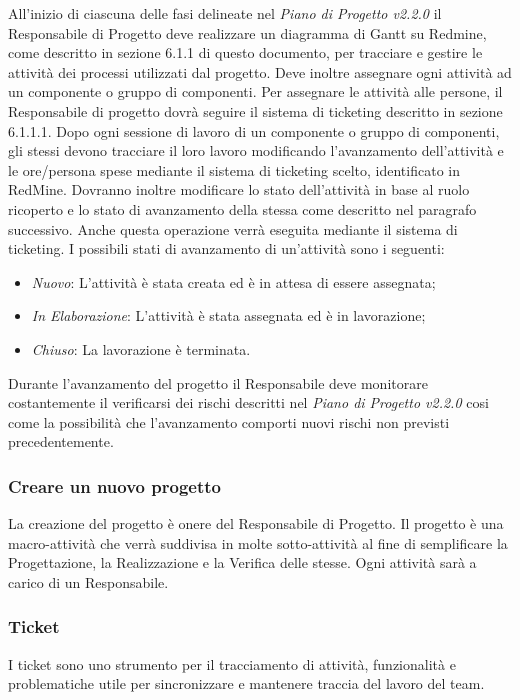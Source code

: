 \label{}
All'inizio di ciascuna delle fasi delineate nel \emph{Piano di Progetto v2.2.0} il Responsabile di Progetto deve realizzare un diagramma di Gantt su Redmine, come descritto in sezione 6.1.1 di questo documento, per tracciare e gestire le attività dei processi utilizzati dal progetto.
Deve inoltre assegnare ogni attività ad un componente o gruppo di componenti.
Per assegnare le attività alle persone, il Responsabile di progetto dovrà seguire il sistema di ticketing descritto in sezione 6.1.1.1. 
\label{}
Dopo ogni sessione di lavoro di un componente o gruppo di componenti, gli stessi devono tracciare il loro lavoro modificando l'avanzamento dell'attività e le ore/persona spese mediante il sistema di ticketing scelto, identificato in RedMine.
Dovranno inoltre modificare lo stato dell'attività in base al ruolo ricoperto e lo stato di avanzamento della stessa come descritto nel paragrafo successivo. Anche questa operazione verrà eseguita mediante il sistema di ticketing.
\label{}
I possibili stati di avanzamento di un'attività sono i seguenti:
\begin{itemize}
\item \emph{Nuovo}: L'attività è stata creata ed è in attesa di essere assegnata;
\item \emph{In Elaborazione}: L'attività è stata assegnata ed è in lavorazione;
\item \emph{Chiuso}: La lavorazione è terminata.
\end{itemize}

\label{}
Durante l'avanzamento del progetto il Responsabile  deve monitorare costantemente il verificarsi dei rischi descritti nel \emph{Piano di Progetto v2.2.0} cosi come la possibilità che l'avanzamento comporti nuovi rischi non previsti precedentemente. 

\subsubsection{Creare un nuovo progetto}
\label{8.1}
La creazione del progetto è onere del Responsabile di Progetto.
Il progetto è una macro-attività che verrà suddivisa in molte sotto-attività al fine di semplificare la Progettazione, la Realizzazione e la Verifica delle stesse. Ogni attività sarà a carico di un Responsabile.

\subsubsection{Ticket}
\label{8.2}
I ticket sono uno strumento per il tracciamento di attività, funzionalità e problematiche utile per sincronizzare e mantenere traccia del lavoro del team.


